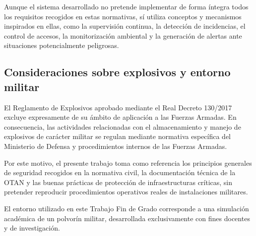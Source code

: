 Aunque el sistema desarrollado no pretende implementar de forma íntegra todos los requisitos recogidos en estas normativas, sí utiliza conceptos y mecanismos inspirados en ellas, como la supervisión continua, la detección de incidencias, el control de accesos, la monitorización ambiental y la generación de alertas ante situaciones potencialmente peligrosas.

\subsection{Consideraciones sobre explosivos y entorno militar}

El Reglamento de Explosivos aprobado mediante el Real Decreto 130/2017 excluye expresamente de su ámbito de aplicación a las Fuerzas Armadas. En consecuencia, las actividades relacionadas con el almacenamiento y manejo de explosivos de carácter militar se regulan mediante normativa específica del Ministerio de Defensa y procedimientos internos de las Fuerzas Armadas.

Por este motivo, el presente trabajo toma como referencia los principios generales de seguridad recogidos en la normativa civil, la documentación técnica de la OTAN y las buenas prácticas de protección de infraestructuras críticas, sin pretender reproducir procedimientos operativos reales de instalaciones militares.

El entorno utilizado en este Trabajo Fin de Grado corresponde a una simulación académica de un polvorín militar, desarrollada exclusivamente con fines docentes y de investigación.
